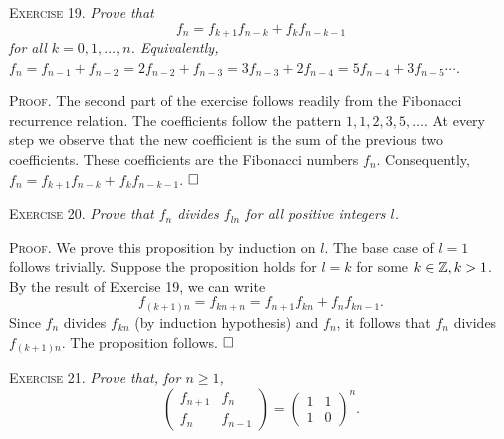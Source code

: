 \documentclass[11pt, leqno]{article}
\newcommand{\done}{\ensuremath{\hfill\square}}
\begin{document}
\textsc{Exercise 19}. \emph{Prove that 
\begin{displaymath}
f_n = f_{k+1}f_{n-k} + f_kf_{n-k-1}
\end{displaymath}
for all $k=0,1,\ldots, n$. Equivalently, $f_n = f_{n-1} + f_{n-2} = 2f_{n-2} + f_{n-3} = 3f_{n-3} + 2f_{n-4} = 5f_{n-4} + 3f_{n-5} \cdots$.}

\textsc{Proof}. The second part of the exercise follows readily from the Fibonacci recurrence relation. The coefficients follow the pattern $1, 1, 2, 3, 5, \ldots$. At every step we observe that the new coefficient is the sum of the previous two coefficients. These coefficients are the Fibonacci numbers $f_n$. Consequently, $f_n = f_{k+1}f_{n-k} + f_kf_{n-k-1}$. \done

\textsc{Exercise 20}. \emph{Prove that $f_n$ divides $f_{ln}$ for all positive integers $l$.}

\textsc{Proof}. We prove this proposition by induction on $l$. The base case of $l = 1$ follows trivially. Suppose the proposition holds for $l = k$ for some $k\in \mathbb{Z}, k>1$. By the result of Exercise 19, we can write 
\begin{displaymath}
  f_{(k+1)n} = f_{kn+n} = f_{n+1}f_{kn} + f_nf_{kn-1}. 
\end{displaymath}
Since $f_n$ divides $f_{kn}$ (by induction hypothesis) and $f_n$, it follows that $f_n$ divides $f_{(k+1)n}$. The proposition follows. \done

\textsc{Exercise 21}. \emph{Prove that, for $n\geq 1$, 
\begin{displaymath}
\begin{pmatrix} f_{n+1} & f_n \\ f_n & f_{n-1} \end{pmatrix} = \begin{pmatrix} 1 & 1 \\ 1 & 0 \end{pmatrix}^n.
\end{displaymath}}
\end{document}
